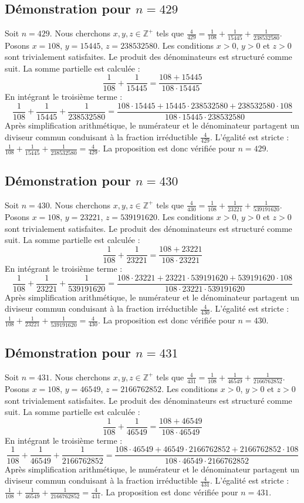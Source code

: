 \documentclass[11pt,a4paper]{article}
\begin{document}
\subsection{Démonstration pour $n = 429$}
Soit $n = 429$. Nous cherchons $x, y, z \in \mathbb{Z}^{+}$ tels que $\frac{4}{429} = \frac{1}{108} + \frac{1}{15445} + \frac{1}{238532580}$.
Posons $x = 108$, $y = 15445$, $z = 238532580$.
Les conditions $x > 0$, $y > 0$ et $z > 0$ sont trivialement satisfaites.
Le produit des dénominateurs est structuré comme suit. La somme partielle est calculée :
$$ \frac{1}{108} + \frac{1}{15445} = \frac{108+15445}{108 \cdot 15445} $$
En intégrant le troisième terme :
$$ \frac{1}{108} + \frac{1}{15445} + \frac{1}{238532580} = \frac{108 \cdot 15445 + 15445 \cdot 238532580 + 238532580 \cdot 108}{108 \cdot 15445 \cdot 238532580} $$
Après simplification arithmétique, le numérateur et le dénominateur partagent un diviseur commun conduisant à la fraction irréductible $\frac{4}{429}$.
L'égalité est stricte : $\frac{1}{108} + \frac{1}{15445} + \frac{1}{238532580} = \frac{4}{429}$.
La proposition est donc vérifiée pour $n = 429$.
\subsection{Démonstration pour $n = 430$}
Soit $n = 430$. Nous cherchons $x, y, z \in \mathbb{Z}^{+}$ tels que $\frac{4}{430} = \frac{1}{108} + \frac{1}{23221} + \frac{1}{539191620}$.
Posons $x = 108$, $y = 23221$, $z = 539191620$.
Les conditions $x > 0$, $y > 0$ et $z > 0$ sont trivialement satisfaites.
Le produit des dénominateurs est structuré comme suit. La somme partielle est calculée :
$$ \frac{1}{108} + \frac{1}{23221} = \frac{108+23221}{108 \cdot 23221} $$
En intégrant le troisième terme :
$$ \frac{1}{108} + \frac{1}{23221} + \frac{1}{539191620} = \frac{108 \cdot 23221 + 23221 \cdot 539191620 + 539191620 \cdot 108}{108 \cdot 23221 \cdot 539191620} $$
Après simplification arithmétique, le numérateur et le dénominateur partagent un diviseur commun conduisant à la fraction irréductible $\frac{4}{430}$.
L'égalité est stricte : $\frac{1}{108} + \frac{1}{23221} + \frac{1}{539191620} = \frac{4}{430}$.
La proposition est donc vérifiée pour $n = 430$.
\subsection{Démonstration pour $n = 431$}
Soit $n = 431$. Nous cherchons $x, y, z \in \mathbb{Z}^{+}$ tels que $\frac{4}{431} = \frac{1}{108} + \frac{1}{46549} + \frac{1}{2166762852}$.
Posons $x = 108$, $y = 46549$, $z = 2166762852$.
Les conditions $x > 0$, $y > 0$ et $z > 0$ sont trivialement satisfaites.
Le produit des dénominateurs est structuré comme suit. La somme partielle est calculée :
$$ \frac{1}{108} + \frac{1}{46549} = \frac{108+46549}{108 \cdot 46549} $$
En intégrant le troisième terme :
$$ \frac{1}{108} + \frac{1}{46549} + \frac{1}{2166762852} = \frac{108 \cdot 46549 + 46549 \cdot 2166762852 + 2166762852 \cdot 108}{108 \cdot 46549 \cdot 2166762852} $$
Après simplification arithmétique, le numérateur et le dénominateur partagent un diviseur commun conduisant à la fraction irréductible $\frac{4}{431}$.
L'égalité est stricte : $\frac{1}{108} + \frac{1}{46549} + \frac{1}{2166762852} = \frac{4}{431}$.
La proposition est donc vérifiée pour $n = 431$.
\end{document}
